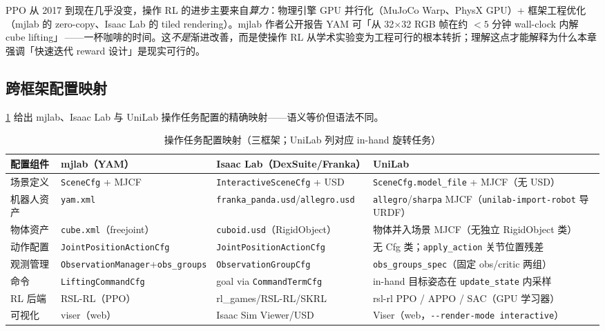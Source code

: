 \begin{insight}\label{ins:rlmc-manip-gpu}
PPO 从 2017 到现在几乎没变，操作 RL 的进步主要来自\emph{算力}：物理引擎 GPU 并行化（MuJoCo Warp、PhysX GPU）+ 框架工程优化（mjlab 的 zero-copy、Isaac Lab 的 tiled rendering）。mjlab 作者公开报告 YAM 可「从 32$\times$32 RGB 帧在约 $<5$ 分钟 wall-clock 内解 cube lifting」\,\cite{zakka2026mjlab}——一杯咖啡的时间。这\emph{不是}渐进改善，而是使操作 RL 从学术实验变为工程可行的根本转折；理解这点才能解释为什么本章强调「快速迭代 reward 设计」是现实可行的。
\end{insight}

\subsection{跨框架配置映射}
\label{sec:rlmc-manip-bridge}

\cref{tab:rlmc-manip-mapping} 给出 mjlab、Isaac Lab 与 UniLab 操作任务配置的精确映射——语义等价但语法不同。

\begin{table}[ht]
\centering
\small
\caption{操作任务配置映射（三框架；UniLab 列对应 in-hand 旋转任务）}
\label{tab:rlmc-manip-mapping}
\begin{tabular}{@{}llll@{}}
\toprule
配置组件 & mjlab（YAM） & Isaac Lab（DexSuite/Franka） & UniLab \\
\midrule
场景定义 & \verb|SceneCfg| + MJCF & \verb|InteractiveSceneCfg| + USD & \verb|SceneCfg.model_file| + MJCF（无 USD） \\
机器人资产 & \verb|yam.xml| & \verb|franka_panda.usd|/\verb|allegro.usd| & \verb|allegro|/\verb|sharpa| MJCF（\verb|unilab-import-robot| 导 URDF） \\
物体资产 & \verb|cube.xml|（freejoint） & \verb|cuboid.usd|（RigidObject） & 物体并入场景 MJCF（无独立 RigidObject 类） \\
动作配置 & \verb|JointPositionActionCfg| & \verb|JointPositionActionCfg| & 无 Cfg 类；\verb|apply_action| 关节位置残差 \\
观测管理 & \verb|ObservationManager|+\verb|obs_groups| & \verb|ObservationGroupCfg| & \verb|obs_groups_spec|（固定 obs/critic 两组） \\
命令 & \verb|LiftingCommandCfg| & goal via \verb|CommandTermCfg| & in-hand 目标姿态在 \verb|update_state| 内采样 \\
RL 后端 & RSL-RL（PPO） & rl\_games/RSL-RL/SKRL & rsl-rl PPO / APPO / SAC（GPU 学习器） \\
可视化 & viser（web） & Isaac Sim Viewer/USD & Viser（web，\verb|--render-mode interactive|） \\
\bottomrule
\end{tabular}
\end{table}

